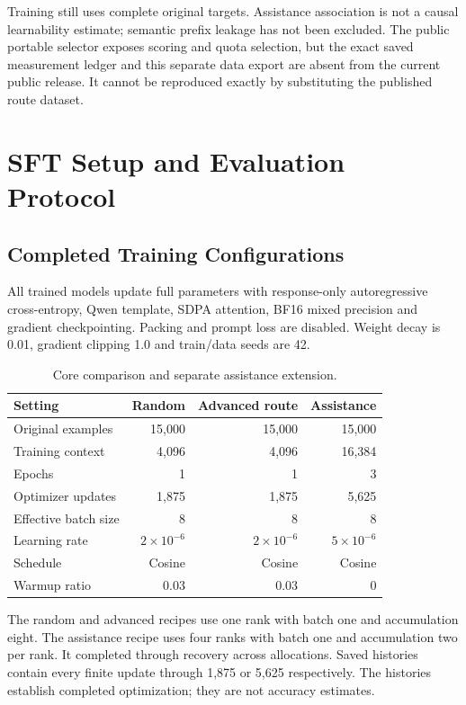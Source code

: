 \documentclass[10pt,letterpaper]{article}
\begin{document}
Training still uses complete original targets. Assistance association is not a causal learnability estimate; semantic prefix leakage has not been excluded. The public portable selector exposes scoring and quota selection, but the exact saved measurement ledger and this separate data export are absent from the current public release. It cannot be reproduced exactly by substituting the published route dataset.

\newpage
\section{SFT Setup and Evaluation Protocol}
\subsection{Completed Training Configurations}
All trained models update full parameters with response-only autoregressive cross-entropy, Qwen template, SDPA attention, BF16 mixed precision and gradient checkpointing. Packing and prompt loss are disabled. Weight decay is 0.01, gradient clipping 1.0 and train/data seeds are 42.

\begin{table}[H]\centering\small
\caption{Core comparison and separate assistance extension.}
\begin{tabular}{lrrr}\toprule
Setting & Random & Advanced route & Assistance\\\midrule
Original examples & 15,000 & 15,000 & 15,000\\
Training context & 4,096 & 4,096 & 16,384\\
Epochs & 1 & 1 & 3\\
Optimizer updates & 1,875 & 1,875 & 5,625\\
Effective batch size & 8 & 8 & 8\\
Learning rate & $2\!\times\!10^{-6}$ & $2\!\times\!10^{-6}$ & $5\!\times\!10^{-6}$\\
Schedule & Cosine & Cosine & Cosine\\
Warmup ratio & 0.03 & 0.03 & 0\\\bottomrule
\end{tabular}
\end{table}
The random and advanced recipes use one rank with batch one and accumulation eight. The assistance recipe uses four ranks with batch one and accumulation two per rank. It completed through recovery across allocations. Saved histories contain every finite update through 1,875 or 5,625 respectively. The histories establish completed optimization; they are not accuracy estimates.
\end{document}
